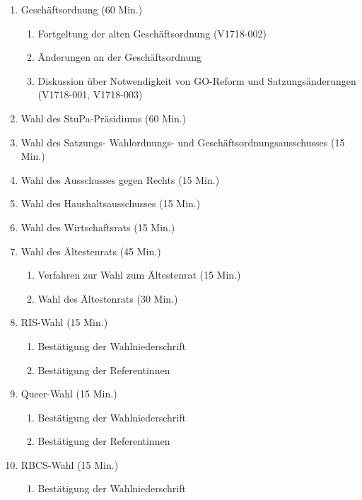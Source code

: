 \documentclass[ngerman,headheight=70pt]{scrartcl}
\begin{document}
    \begin{enumerate}[label={\textbf{Top \theenumi}},leftmargin=*]
        \item Geschäftsordnung (60 Min.)
            \begin{enumerate}
                \item Fortgeltung der alten Geschäftsordnung (V1718-002)
                \item Änderungen an der Geschäftsordnung
                \item Diskussion über Notwendigkeit von GO-Reform und
                Satzungsänderungen (V1718-001, V1718-003)
            \end{enumerate}
        \item Wahl des StuPa-Präsidiums (60 Min.)
        \item Wahl des Satzungs- Wahlordnungs- und  Geschäftsordnungsausschusses (15 Min.)
        \item Wahl des Ausschusses gegen Rechts (15 Min.)
        \item Wahl des Haushaltsausschusses (15 Min.)
        \item Wahl des Wirtschaftsrats (15 Min.)
        \item Wahl des Ältestenrats (45 Min.)
            \begin{enumerate}
                \item Verfahren zur Wahl zum Ältestenrat (15 Min.)
                \item Wahl des Ältestenrats (30 Min.)
            \end{enumerate}
        \item RIS-Wahl (15 Min.)
            \begin{enumerate}
                \item Bestätigung der Wahlniederschrift
                \item Bestätigung der Referentinnen
            \end{enumerate}
        \item Queer-Wahl (15 Min.)
            \begin{enumerate}
                \item Bestätigung der Wahlniederschrift
                \item Bestätigung der Referentinnen
            \end{enumerate}
        \item RBCS-Wahl (15 Min.)
            \begin{enumerate}
                \item Bestätigung der Wahlniederschrift

\end{enumerate}
\end{enumerate}
\end{document}
